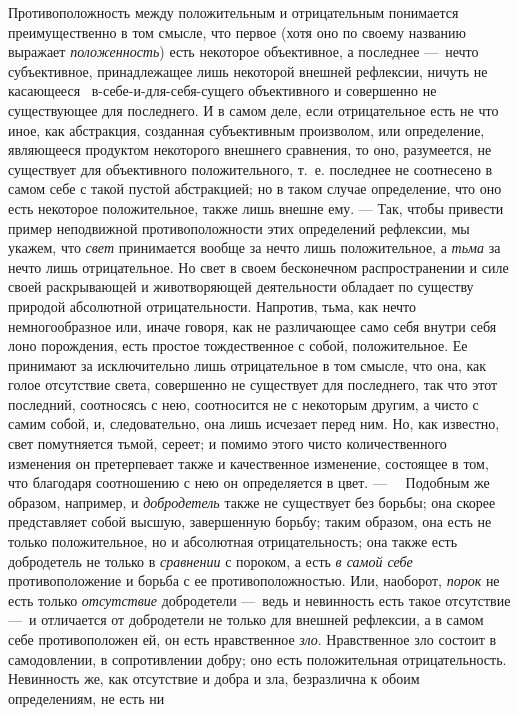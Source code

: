 Противоположность между положительным и отрицательным понимается
преимущественно в том смысле, что первое (хотя оно по своему названию
выражает {\em положенность}) есть некоторое
объективное, а последнее —~нечто субъективное, принадлежащее лишь некоторой
внешней рефлексии, ничуть не касающееся \ в-себе-и-для-себя-сущего
объективного и совершенно не существующее для последнего. И в самом деле,
если отрицательное есть не что иное, как абстракция, созданная субъективным
произволом, или определение, являющееся продуктом некоторого внешнего
сравнения, то оно, разумеется, не существует для объективного
положительного, т.~е. последнее не соотнесено в самом себе с такой пустой
абстракцией; но в таком случае определение, что оно есть некоторое
положительное, также лишь внешне ему. — Так, чтобы привести пример
неподвижной противоположности этих определений рефлексии, мы укажем, что
{\em свет} принимается вообще за нечто лишь
положительное, а {\em тьма} за нечто лишь
отрицательное. Но свет в своем бесконечном распространении и силе своей
раскрывающей и животворяющей деятельности обладает по существу природой
абсолютной отрицательности. Напротив, тьма, как нечто немногообразное или,
иначе говоря, как не различающее само себя внутри себя лоно порождения,
есть простое тождественное с собой, положительное. Ее принимают за
исключительно лишь отрицательное в том смысле, что она, как голое
отсутствие света, совершенно не существует для последнего, так что этот
последний, соотносясь с нею, соотносится не с некоторым другим, а чисто с
самим собой, и, следовательно, она лишь исчезает перед ним. Но, как
известно, свет помутняется тьмой, сереет; и помимо этого чисто
количественного изменения он претерпевает также и качественное изменение,
состоящее в том, что благодаря соотношению с нею он определяется в цвет. —
\ \ Подобным же образом, например, и {\em добродетель}
также не существует без борьбы; она скорее представляет собой высшую,
завершенную борьбу; таким образом, она есть не только положительное, но и
абсолютная отрицательность; она также есть добродетель не только в
{\em сравнении} с пороком, а есть
{\em в самой себе} противоположение и борьба с ее
противоположностью. Или, наоборот, {\em порок} не есть
только {\em отсутствие} добродетели —~ведь и невинность
есть такое отсутствие —~и отличается от добродетели не только для внешней
рефлексии, а в самом себе противоположен ей, он есть нравственное
{\em зло}. Нравственное зло состоит в самодовлении, в
сопротивлении добру; оно есть положительная отрицательность. Невинность же,
как отсутствие и добра и зла, безразлична к обоим определениям, не есть ни
